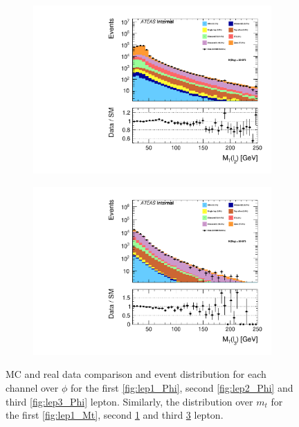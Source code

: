 \begin{figure}
{\begin{subfigure}{.425\textwidth}
        \includegraphics[width=\textwidth]{Figures/FeaturesHistograms/lep2_Mt.pdf}
        \caption{}
        \label{fig:lep2_Mt}
    \end{subfigure}
    \hfill
    \begin{subfigure}{.425\textwidth}
        \includegraphics[width=\textwidth]{Figures/FeaturesHistograms/lep3_Mt.pdf}
        \caption{}
        \label{fig:lep3_Mt}
    \end{subfigure}
    }
    \caption{\ac{MC} and real data comparison and event distribution for each channel over $\phi$ for the first \ref{fig:lep1_Phi}, 
    second \ref{fig:lep2_Phi} and third \ref{fig:lep3_Phi} lepton. Similarly, the distribution over $m_t$
    for the first \ref{fig:lep1_Mt}, second \ref{fig:lep2_Mt} and third \ref{fig:lep3_Mt} lepton.}
\end{figure}
